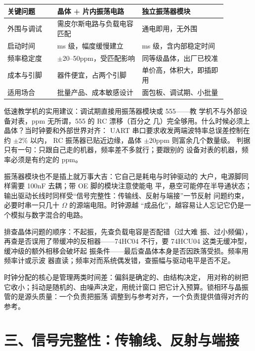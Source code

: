 \begin{longtable}{L{0.2\linewidth}L{0.34\linewidth}L{0.34\linewidth}}
\toprule
关键问题 & 晶体 + 片内振荡电路 & 独立振荡器模块 \\
\midrule
外围与调试 & 需皮尔斯电路与负载电容匹配 & 通电即用，无外围 \\\tablerowrule
启动时间 & ms 级，幅度缓慢建立 & ms 级，含内部稳定时间 \\\tablerowrule
频率稳定度 & $\pm$20--50ppm，受匹配影响 & 同等级晶体，出厂已校准 \\\tablerowrule
成本与引脚 & 器件便宜，占两个引脚 & 单价高，体积大，即插即用 \\\tablerowrule
适用场合 & 批量产品、成本敏感设计 & 面包板、调试期、小批量 \\
\bottomrule
\end{longtable}

低速教学机的实用建议：调试期直接用振荡器模块或 555——教
学机不与外部设备对表，ppm 无所谓，555 的 RC 漂移（百分之
几）完全够用。什么时候必须上晶体？当时钟要和外部世界对齐：
UART 串口要求收发两端波特率总误差控制在约 $\pm$2\% 以内，
RC 振荡器已贴近边缘，晶体 $\pm$20ppm 则富余几个数量级。
判据只有一句：只跟自己走的机器，频率差不多就行；要跟别的
设备对表的机器，频率必须是有约定的 ppm。

振荡器模块也不是插上就万事大吉：它自己是耗电与时钟驱动的
大户，电源脚同样需要 100nF 去耦；带 OE 脚的模块注意使能电
平，悬空可能停在半导通状态；输出驱动长线时同样受“信号完整性：传输线、反射与端接”一节反射
问题约束，必要时串一只几十 $\Omega$ 的源端电阻。时钟源越
“成品化”，越容易让人忘记它仍是一个模拟与数字混合的电路。

排查晶体问题的顺序：不起振，先查负载电容是否配错（过大难
振、过小频偏），再查是否误用了带缓冲的反相器——74HC04
不行，要 74HCU04 这类无缓冲型，缓冲级的额外相移会破坏起
振条件——最后查晶体本身是否因跌落受损。频率用频率计或示波
器直读；频率对而系统偶发错，查振幅与驱动电平是否不足。

\begin{keyidea}
时钟分配的核心是管理两类时间差：偏斜是确定的、由结构决定，
用对称的树把它收小；抖动是随机的、由噪声决定，用统计窗口
把它计入预算。锁相环与晶振管的是源头质量：一个负责把振荡
调整到与参考对齐，一个负责提供值得对齐的参考。
\end{keyidea}

\section{三、信号完整性：传输线、反射与端接}

